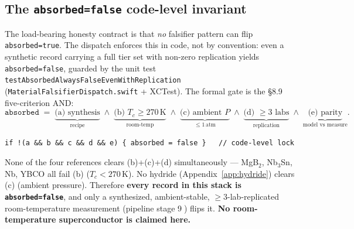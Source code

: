 \subsection{The \texttt{absorbed=false} code-level invariant}
\label{app:mat-invariant}

The load-bearing honesty contract is that \emph{no} falsifier pattern can
flip \texttt{absorbed=true}. The dispatch enforces this in code, not by
convention: even a synthetic record carrying a full tier set with non-zero
replication yields \texttt{absorbed=false}, guarded by the unit test
\texttt{testAbsorbedAlwaysFalseEvenWithReplication}
(\texttt{MaterialFalsifierDispatch.swift} + XCTest). The formal gate is the
\S8.9 five-criterion AND:
\begin{equation}
\texttt{absorbed} \;=\;
  \underbrace{\text{(a) synthesis}}_{\text{recipe}} \;\wedge\;
  \underbrace{\text{(b) } T_c\!\ge\!270\,\text{K}}_{\text{room-temp}} \;\wedge\;
  \underbrace{\text{(c) ambient } P}_{\le 1\,\text{atm}} \;\wedge\;
  \underbrace{\text{(d) } \ge\!3\text{ labs}}_{\text{replication}} \;\wedge\;
  \underbrace{\text{(e) parity}}_{\text{model vs measure}} .
\label{eq:fivegate}
\end{equation}
\begin{lstlisting}
if !(a && b && c && d && e) { absorbed = false }   // code-level lock
\end{lstlisting}
None of the four references clears (b)+(c)+(d) simultaneously --- MgB$_2$,
Nb$_3$Sn, Nb, YBCO all fail (b) ($T_c\!<\!270$\,K). No hydride
(Appendix~\ref{app:hydride}) clears (c) (ambient pressure). Therefore
\textbf{every record in this stack is \texttt{absorbed=false}}, and only a
synthesized, ambient-stable, $\ge\!3$-lab-replicated room-temperature
measurement (pipeline stage \textcircled{\scriptsize 9}) flips it.
\textbf{No room-temperature superconductor is claimed here.}

